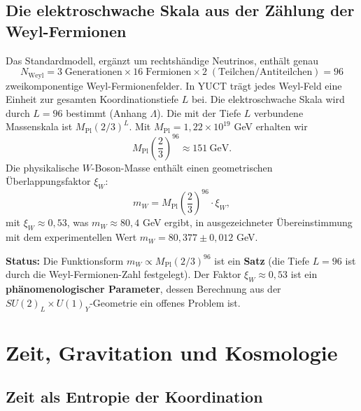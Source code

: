 \documentclass[12pt,a4paper]{article}
\begin{document}
	\subsection{Die elektroschwache Skala aus der Zählung der Weyl-Fermionen}
	
	Das Standardmodell, ergänzt um rechtshändige Neutrinos, enthält genau
	\begin{equation}
		N_{\mathrm{Weyl}} = 3\;\text{Generationen} \times 16\;\text{Fermionen} \times 2\;(\text{Teilchen/Antiteilchen}) = 96
	\end{equation}
	zweikomponentige Weyl-Fermionenfelder. In YUCT trägt jedes Weyl-Feld eine Einheit zur gesamten Koordinationstiefe \(L\) bei. Die elektroschwache Skala wird durch \(L = 96\) bestimmt (Anhang \(\Lambda\)). Die mit der Tiefe \(L\) verbundene Massenskala ist \(M_{\mathrm{Pl}} (2/3)^{L}\). Mit \(M_{\mathrm{Pl}} = 1,22 \times 10^{19}\) GeV erhalten wir
	\begin{equation}
		M_{\mathrm{Pl}} \left(\frac{2}{3}\right)^{96} \approx 151\ \mathrm{GeV}.
	\end{equation}
	Die physikalische \(W\)-Boson-Masse enthält einen geometrischen Überlappungsfaktor \(\xi_W\):
	\begin{equation}
		m_W = M_{\mathrm{Pl}} \left(\frac{2}{3}\right)^{96} \cdot \xi_W,
		\label{eq:mw}
	\end{equation}
	mit \(\xi_W \approx 0,53\), was \(m_W \approx 80,4\) GeV ergibt, in ausgezeichneter Übereinstimmung mit dem experimentellen Wert \(m_W = 80,377 \pm 0,012\) GeV.
	
	\textbf{Status:} Die Funktionsform \(m_W \propto M_{\mathrm{Pl}} (2/3)^{96}\) ist ein \textbf{Satz} (die Tiefe \(L=96\) ist durch die Weyl-Fermionen-Zahl festgelegt). Der Faktor \(\xi_W \approx 0,53\) ist ein \textbf{phänomenologischer Parameter}, dessen Berechnung aus der \(SU(2)_L \times U(1)_Y\)-Geometrie ein offenes Problem ist.
	
	\section{Zeit, Gravitation und Kosmologie}
	\label{sec:cosmology}
	
	\subsection{Zeit als Entropie der Koordination}
	
\end{document}
